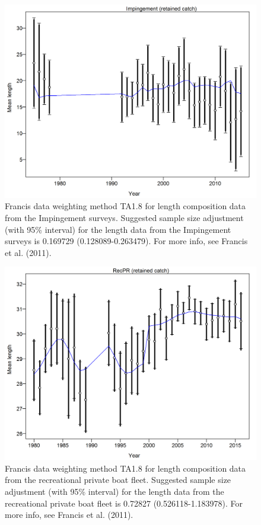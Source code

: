 \documentclass[12pt,]{article}
\begin{document}
\begin{figure}[htbp]
\centering
\includegraphics{r4ss/plots_mod1/comp_lenfit_data_weighting_TA1.8_Impingement.png}
\caption{Francis data weighting method TA1.8 for length composition data
from the Impingement surveys. Suggested sample size adjustment (with
95\% interval) for the length data from the Impingement surveys is
0.169729 (0.128089-0.263479). For more info, see Francis et al. (2011).
\label{fig:comp_lenfit_data_weighting_TA1.8_Impingement}}
\end{figure}

\begin{figure}[htbp]
\centering
\includegraphics{r4ss/plots_mod1/comp_lenfit_data_weighting_TA1.8_RecPR.png}
\caption{Francis data weighting method TA1.8 for length composition data
from the recreational private boat fleet. Suggested sample size
adjustment (with 95\% interval) for the length data from the
recreational private boat fleet is 0.72827 (0.526118-1.183978). For more
info, see Francis et al. (2011).
\label{fig:comp_lenfit_data_weighting_TA1.8_RecPR}}
\end{figure}
\end{document}
